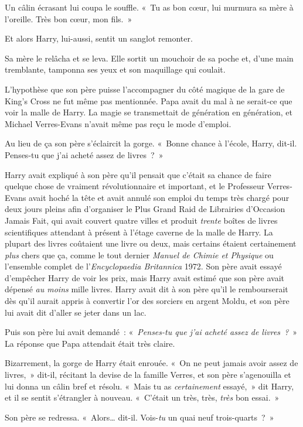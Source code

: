 Un câlin écrasant lui coupa le souffle. «~Tu as bon cœur, lui murmura sa mère à l'oreille. Très bon cœur, mon fils.~»

Et alors Harry, lui-aussi, sentit un sanglot remonter.

Sa mère le relâcha et se leva. Elle sortit un mouchoir de sa poche et, d'une main tremblante, tamponna ses yeux et son maquillage qui coulait.

L'hypothèse que son père puisse l'accompagner du côté magique de la gare de King's Cross ne fut même pas mentionnée. Papa avait du mal à ne serait-ce que voir la malle de Harry. La magie se transmettait de génération en génération, et Michael Verres-Evans n'avait même pas reçu le mode d'emploi.

Au lieu de ça son père s'éclaircit la gorge. «~Bonne chance à l'école, Harry, dit-il. Penses-tu que j'ai acheté assez de livres~?~»

Harry avait expliqué à son père qu'il pensait que c'était sa chance de faire quelque chose de vraiment révolutionnaire et important, et le Professeur Verres-Evans avait hoché la tête et avait annulé son emploi du temps très chargé pour deux jours pleins afin d'organiser le Plus Grand Raid de Librairies d'Occasion Jamais Fait, qui avait couvert quatre villes et produit \emph{trente} boîtes de livres scientifiques attendant à présent à l'étage caverne de la malle de Harry. La plupart des livres coûtaient une livre ou deux, mais certains étaient certainement \emph{plus} chers que ça, comme le tout dernier \emph{Manuel de Chimie et Physique} ou l'ensemble complet de l'\emph{Encyclopaedia Britannica} 1972. Son père avait essayé d'empêcher Harry de voir les prix, mais Harry avait estimé que son père avait dépensé \emph{au moins} mille livres. Harry avait dit à son père qu'il le rembourserait dès qu'il aurait appris à convertir l'or des sorciers en argent Moldu, et son père lui avait dit d'aller se jeter dans un lac.

Puis son père lui avait demandé~: «~\emph{Penses-tu que j'ai acheté assez de livres~?}~» La réponse que Papa attendait était très claire.

Bizarrement, la gorge de Harry était enrouée. «~On ne peut jamais avoir assez de livres,~» dit-il, récitant la devise de la famille Verres, et son père s'agenouilla et lui donna un câlin bref et résolu. «~Mais tu as \emph{certainement} essayé,~» dit Harry, et il se sentit s'étrangler à nouveau. «~C'était un très, très, \emph{très} bon essai.~»

Son père se redressa. «~Alors… dit-il. Vois-\emph{tu} un quai neuf trois-quarts~?~»

